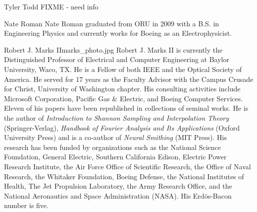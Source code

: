 \begin{authorbio}{Tyler Todd}{}
FIXME - need info
\end{authorbio}

\begin{authorbio}{Nate Roman}{}
Nate Roman graduated from ORU in 2009 with a B.S. in Engineering Physics and currently works for Boeing as an Electrophysicist.
\end{authorbio}

\begin{authorbio}{Robert J. Marks II}{marks_photo.jpg}
Robert J. Marks II is currently the Distinguished Professor of Electrical and Computer Engineering 
at Baylor University, Waco, TX. He is a Fellow of both IEEE and the Optical Society
of America. He served for 17 years as the Faculty Advisor with the Campus Crusade for Christ,
University of Washington chapter. His consulting activities include Microsoft Corporation, Pacific
Gas \& Electric, and Boeing Computer Services. Eleven of his papers have been republished in collections 
of seminal works. He is the author of \textit{Introduction to Shannon Sampling and Interpolation
Theory} (Springer-Verlag), \textit{Handbook of Fourier Analysis and Its Applications} (Oxford University
Press) and is a co-author of \textit{Neural Smithing} (MIT Press). His research has been funded by organizations 
such as the National Science Foundation, General Electric, Southern California Edison,
Electric Power Research Institute, the Air Force Office of Scientific Research, the Office of Naval
Research, the Whitaker Foundation, Boeing Defense, the National Institutes of Health, The Jet
Propulsion Laboratory, the Army Research Office, and the National Aeronautics and Space Administration 
(NASA). 
His Erd\"{o}s-Bacon
number is five.
\end{authorbio}

